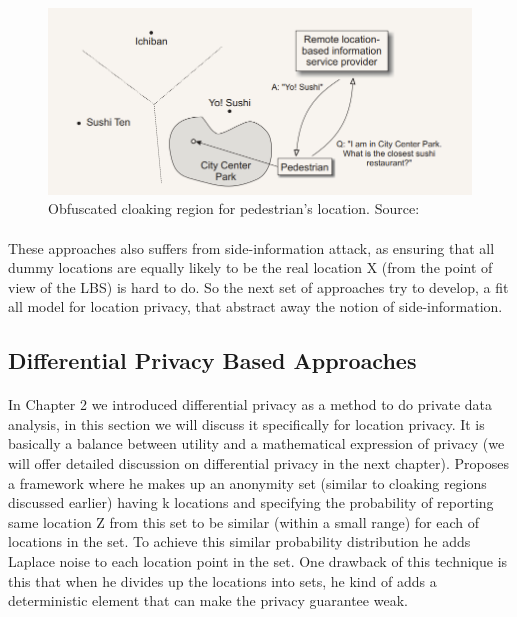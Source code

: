 \documentclass[12pt]{report}
\theoremstyle{named}
\begin{document}
\begin{figure}[ht]
\centering
        \includegraphics[width=120mm,scale=1]{Images/obfuscationRegion.PNG}
    \caption{Obfuscated cloaking region for pedestrian's location. Source:\cite{duckham2005formal}}
    \label{fig:obfuscationRegion}
\end{figure}

\paragraph{}
These approaches also suffers from side-information attack, as ensuring that all dummy locations are equally likely to be the real location X (from the point of view of the LBS) is hard to do. So the next set of approaches try to develop, a fit all model for location privacy, that abstract away the notion of side-information.



\subsection{Differential Privacy Based Approaches}
\paragraph{}
In Chapter 2 we introduced differential privacy as a method to do private data analysis, in this section we will discuss it specifically for location privacy. It is basically a balance between utility and a mathematical expression of privacy (we will offer detailed discussion on differential privacy in the next chapter).
\cite{dewri2013local} Proposes a framework where he makes up an anonymity set (similar to cloaking regions discussed earlier) having k locations and specifying the probability of reporting same location Z from this set to be similar (within a small range) for each of locations in the set. To achieve this similar probability distribution he adds Laplace noise to each location point in the set. One drawback of this technique is this that when he divides up the locations into sets, he kind of adds a deterministic element that can make the privacy guarantee weak. 
\end{document}
